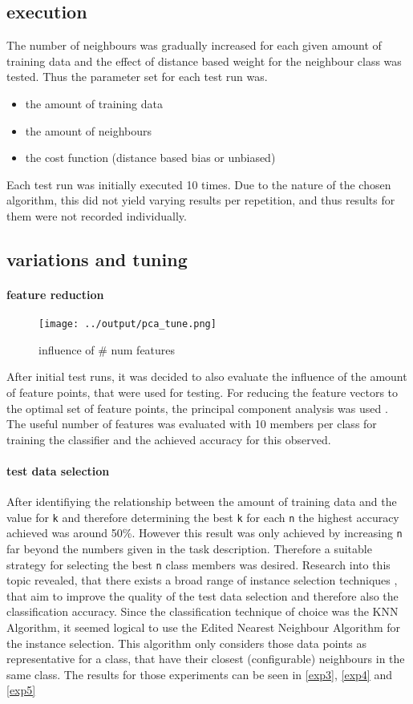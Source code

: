 \documentclass[10pt,a4paper]{proc}
\begin{document}
\subsection*{execution}
The number of neighbours was gradually increased for each given amount of training data and the effect of distance based weight for the neighbour class was tested. Thus the parameter set for each test run was.
\begin{itemize}
\item the amount of training data
\item the amount of neighbours
\item the cost function (distance based bias or unbiased)
\end{itemize}
Each test run was initially executed 10 times. Due to the nature of the chosen algorithm, this did not yield varying results per repetition, and thus results for them were not recorded individually.
\subsection{variations and tuning}\label{substune}
\paragraph*{feature reduction}
\begin{figure}[htbp]
\texttt{[image: ../output/pca\_tune.png]}
\caption{influence of \# num features}
\label{fig:numfeatures}
\end{figure}
After initial test runs, it was decided to also evaluate the influence of the amount of feature points, that were used for testing. For reducing the feature vectors to the optimal set of feature points, the principal component analysis was used \cite{wold1987principal}. The useful number of features was evaluated with 10 members per class for training the classifier and the achieved accuracy for this observed. 
\paragraph*{test data selection}
After identifiying the relationship between the amount of training data and the value for \texttt{k} and therefore determining the best \texttt{k} for each \texttt{n} the highest accuracy achieved was around 50\%. However this result was only achieved by increasing \texttt{n} far beyond the numbers given in the task description. Therefore a suitable strategy for selecting the best \texttt{n} class members was desired. Research into this topic revealed, that there exists a broad range of instance selection techniques \cite{arnaiz2018estudio}, that aim to improve the quality of the test data selection and therefore also the classification accuracy. Since the classification technique of choice was the KNN Algorithm, it seemed logical to use the Edited Nearest Neighbour Algorithm for the instance selection. This algorithm only considers those data points as representative for a class, that have their closest (configurable) neighbours in the same class. The results for those experiments can be seen in \ref{exp3}, \ref{exp4} and \ref{exp5} 
\onecolumn
\end{document}

